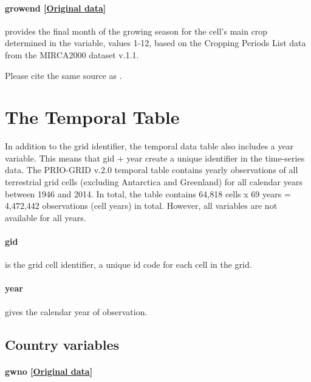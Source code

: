 \documentclass[]{book}
\begin{document}
\paragraph{growend
{[}\href{http://www.uni-frankfurt.de/45218031}{Original
data}{]}}\label{growend}

provides the final month of the growing season for the cell's main crop
determined in the  variable, values 1-12, based on the
Cropping Periods List data from the MIRCA2000 dataset v.1.1.

Please cite the same source as .

\section{The Temporal Table}\label{the-temporal-table}

In addition to the grid identifier, the temporal data table also
includes a year variable. This means that gid + year create a unique
identifier in the time-series data. The PRIO-GRID v.2.0 temporal table
contains yearly observations of all terrestrial grid cells (excluding
Antarctica and Greenland) for all calendar years between 1946 and 2014.
In total, the table contains 64,818 cells x 69 years = 4,472,442
observations (cell years) in total. However, all variables are not
available for all years.

\paragraph{gid}\label{gid-2}

is the grid cell identifier, a unique id code for each cell in the grid.

\paragraph{year}\label{year}

gives the calendar year of observation.

\subsection{Country variables}\label{country-variables}

\paragraph{gwno
{[}\href{http://nils.weidmann.ws/projects/cshapes}{Original
data}{]}}\label{gwno}
\end{document}
